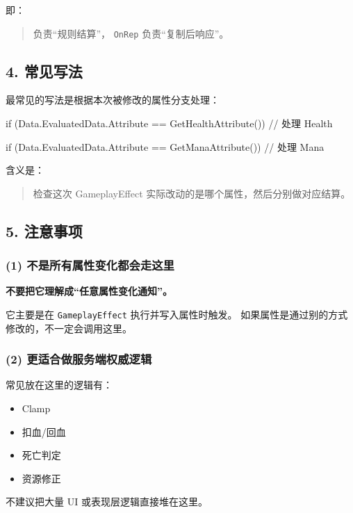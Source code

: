 \documentclass[10pt,CJKmath]{ctexart}
\begin{document}
即：

\begin{quote}
	 负责“规则结算”，  
	\verb|OnRep| 负责“复制后响应”。
\end{quote}

\subsection{4. 常见写法}

最常见的写法是根据本次被修改的属性分支处理：

\begin{code}
if (Data.EvaluatedData.Attribute == GetHealthAttribute())
{
	// 处理 Health
}
	
if (Data.EvaluatedData.Attribute == GetManaAttribute())
{
	// 处理 Mana
}
\end{code}

含义是：

\begin{quote}
	检查这次 GameplayEffect 实际改动的是哪个属性，然后分别做对应结算。
\end{quote}

\subsection{5. 注意事项}

\subsubsection{(1) 不是所有属性变化都会走这里}

\textbf{不要把它理解成“任意属性变化通知”。}

它主要是在 \verb|GameplayEffect| 执行并写入属性时触发。  
如果属性是通过别的方式修改的，不一定会调用这里。

\subsubsection{(2) 更适合做服务端权威逻辑}

常见放在这里的逻辑有：

\begin{itemize}
	\item Clamp
	\item 扣血/回血
	\item 死亡判定
	\item 资源修正
\end{itemize}

不建议把大量 UI 或表现层逻辑直接堆在这里。
\end{document}
